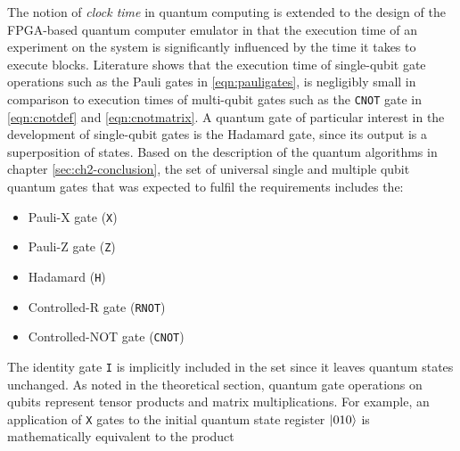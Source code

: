 The notion of \textit{clock time} in quantum computing is extended to the design of the FPGA-based quantum computer emulator in that the execution time of an experiment on the system is significantly influenced by the time it takes to execute  blocks. Literature shows that the execution time of single-qubit gate operations such as the Pauli gates in \ref{eqn:pauligates}, is negligibly small in comparison to execution times of multi-qubit gates such as the \texttt{CNOT} gate in \ref{eqn:cnotdef} and \ref{eqn:cnotmatrix}. A quantum gate of particular interest in the development of single-qubit gates is the Hadamard gate, since its output is a superposition of states. Based on the description of the quantum algorithms in chapter \ref{sec:ch2-conclusion}, the set of universal single and multiple qubit quantum gates that was expected to fulfil the requirements includes the:
\begin{itemize}
	\item 
	Pauli-X gate (\texttt{X})
	\item 
	Pauli-Z gate (\texttt{Z})
	\item 
	Hadamard (\texttt{H})
	\item 
	Controlled-R gate (\texttt{RNOT})
	\item 
	Controlled-NOT gate (\texttt{CNOT})
\end{itemize}
The identity gate \texttt{I} is implicitly included in the set since it leaves quantum states unchanged. As noted in the theoretical section, quantum gate operations on qubits represent tensor products and matrix multiplications. For example, an application of \texttt{X} gates to the initial quantum state register $\ket{010}$ is mathematically equivalent to the product
